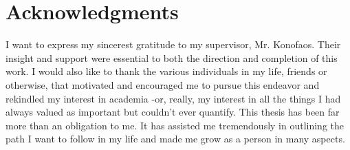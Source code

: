\chapter*{Acknowledgments}

I want to express my sincerest gratitude to my supervisor, Mr. Konofaos. Their insight and support were essential to both the direction and completion of this work. I would also like to thank the various individuals in my life, friends or otherwise, that motivated and encouraged me to pursue this endeavor and rekindled my interest in academia -or, really, my interest in all the things I had always valued as important but couldn't ever quantify. This thesis has been far more than an obligation to me. It has assisted me tremendously in outlining the path I want to follow in my life and made me grow as a person in many aspects.

